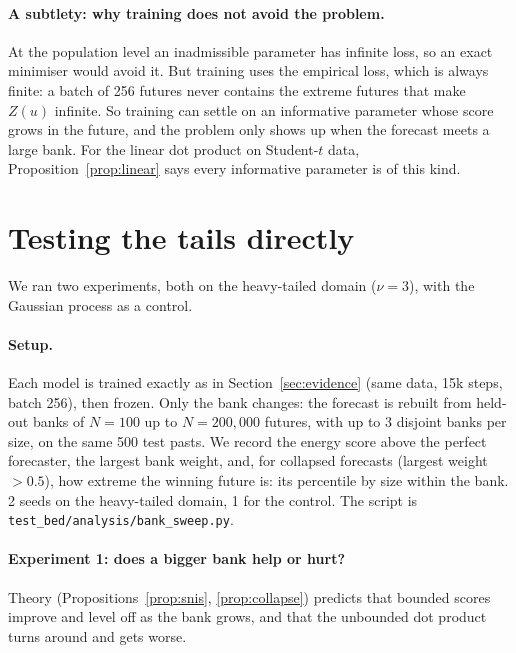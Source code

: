 \documentclass[11pt]{article}
\theoremstyle{plain}
\theoremstyle{definition}
\theoremstyle{remark}
\begin{document}
\paragraph{A subtlety: why training does not avoid the problem.} At the population level an
inadmissible parameter has infinite loss, so an exact minimiser would avoid it. But training
uses the empirical loss, which is always finite: a batch of 256 futures never contains the
extreme futures that make $Z(u)$ infinite. So training can settle on an informative
parameter whose score grows in the future, and the problem only shows up when the forecast
meets a large bank. For the linear dot product on Student-$t$ data, Proposition~\ref{prop:linear}
says every informative parameter is of this kind.

\section{Testing the tails directly}\label{sec:exp}

We ran two experiments, both on the heavy-tailed domain ($\nu=3$), with the Gaussian
process as a control.

\paragraph{Setup.} Each model is trained exactly as in Section~\ref{sec:evidence} (same data,
15k steps, batch 256), then frozen. Only the bank changes: the forecast is rebuilt from
held-out banks of $N=100$ up to $N=200{,}000$ futures, with up to 3 disjoint banks per size,
on the same 500 test pasts. We record the energy score above the perfect forecaster, the
largest bank weight, and, for collapsed forecasts (largest weight $>0.5$), how extreme the
winning future is: its percentile by size within the bank. 2 seeds on the heavy-tailed
domain, 1 for the control. The script is \texttt{test\_bed/analysis/bank\_sweep.py}.

\paragraph{Experiment 1: does a bigger bank help or hurt?} Theory
(Propositions~\ref{prop:snis}, \ref{prop:collapse}) predicts that bounded scores improve and
level off as the bank grows, and that the unbounded dot product turns around and gets worse.
\end{document}
